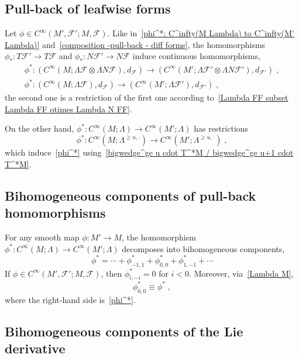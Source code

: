 \documentclass{memo-l}
\theoremstyle{plain}
\theoremstyle{definition}
\theoremstyle{remark}
\newcommand{\FF}{\mathcal{F}}
\numberwithin{section}{chapter}
\numberwithin{equation}{section}%
\begin{document}
\subsection{Pull-back of leafwise forms}\label{ss: pull-back of leafwise forms}

Let $\phi\in C^\infty(M',\FF';M,\FF)$. Like in~\eqref{phi^*: C^infty(M Lambda) to C^infty(M' Lambda)} and~\eqref{composition -pull-back - diff forms}, the homomorphisms $\phi_*:T\FF'\to T\FF$ and $\phi_*:N\FF'\to N\FF$ induce continuous homomorphisms,
\begin{gather}
\phi^*:(C^\infty(M;\Lambda\FF\otimes\Lambda N\FF),d_\FF)\to(C^\infty(M';\Lambda\FF'\otimes\Lambda N\FF'),d_{\FF'})\;,
\label{phi^*}\\
\phi^*:(C^\infty(M;\Lambda\FF),d_\FF)\to(C^\infty(M';\Lambda\FF'),d_{\FF'})\;,
\label{phi^* on leafwise forms}
\end{gather}
the second one is a restriction of the first one according to~\eqref{Lambda FF subset Lambda FF otimes Lambda N FF}.

On the other hand, $\phi^*:C^\infty(M;\Lambda)\to C^\infty(M';\Lambda)$ has restrictions
\[
\phi^*:C^\infty(M;\Lambda^{\ge u,\cdot})\to C^\infty(M';\Lambda^{\ge u,\cdot})\;,
\]
which induce~\eqref{phi^*} using~\eqref{bigwedge^ge u cdot T^*M / bigwedge^ge u+1 cdot T^*M}. 


\subsection{Bihomogeneous components of pull-back homomorphisms}\label{ss: phi^*_i -i}

For any smooth map $\phi:M'\to M$, the homomorphism $\phi^*:C^\infty(M;\Lambda)\to C^\infty(M';\Lambda)$ decomposes into bihomogeneous components,
\[
\phi^*=\cdots+\phi^*_{-1,1}+\phi^*_{0,0}+\phi^*_{1,-1}+\cdots
\]
If $\phi\in C^\infty(M',\FF';M,\FF)$, then $\phi^*_{i,-i}=0$ for $i<0$. Moreover, via~\eqref{Lambda M},
\begin{equation}\label{phi^*_0 0 equiv phi^*}
\phi^*_{0,0}\equiv\phi^*\;,
\end{equation}
where the right-hand side is~\eqref{phi^*}.


\subsection{Bihomogeneous components of the Lie derivative}\label{ss: LL_X i -i}
\end{document}
